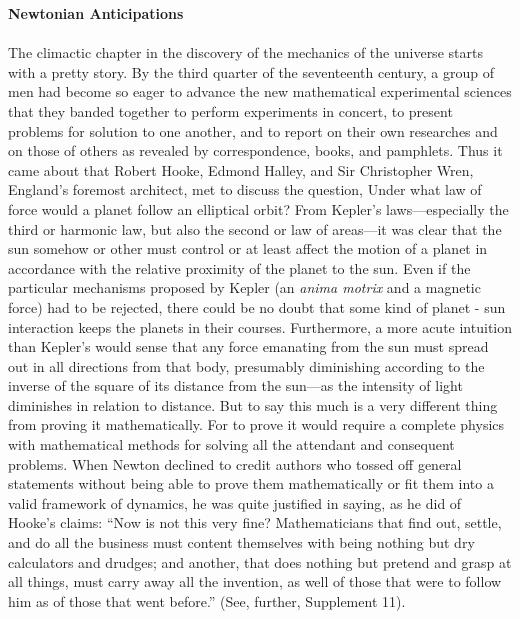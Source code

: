\documentclass{article}
\begin{document}
\noindent\textbf{Newtonian Anticipations}\\
\\
The climactic chapter in the discovery of the mechanics of the universe starts with a pretty story. By the third quarter of the seventeenth century, a group of men had become so eager to advance the new mathematical experimental sciences that they banded together to perform experiments in concert, to present problems for solution to one another, and to report on their own researches and on those of others as revealed by correspondence, books, and pamphlets. Thus it came about that Robert Hooke, Edmond Halley, and Sir Christopher Wren, England’s foremost architect, met to discuss the question, Under what law of force would a planet follow an elliptical orbit? From Kepler’s laws—especially the third or harmonic law, but also the second or law of areas—it was clear that the sun somehow or other must control or at least affect the motion of a planet in accordance with the relative proximity of the planet to the sun. Even if the particular mechanisms proposed by Kepler (an \textit{anima motrix} and a magnetic force) had to be rejected, there could be no doubt that some kind of planet - sun interaction keeps the planets in their courses. Furthermore, a more acute intuition than Kepler’s would sense that any force emanating from the sun must spread out in all directions from that body, presumably diminishing according to the inverse of the square of its distance from the sun—as the intensity of light diminishes in relation to distance. But to say this much is a very different thing from proving it mathematically. For to prove it would require a complete physics with mathematical methods for solving all the attendant and consequent problems. When Newton declined to credit authors who tossed off general statements without being able to prove them mathematically or fit them into a valid framework of dynamics, he was quite justified in saying, as he did of Hooke’s claims: “Now is not this very fine? Mathematicians that find out, settle, and do all the business must content themselves with being nothing but dry calculators and drudges; and another, that does nothing but pretend and grasp at all things, must carry away all the invention, as well of those that were to follow him as of those that went before.” (See, further, Supplement 11).\\
\end{document}
